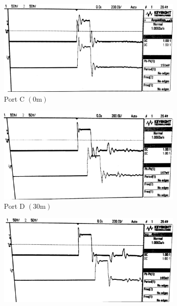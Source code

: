 \documentclass[10pt]{article}
\begin{document}
\begin{figure}[ht]
    \centering
    \begin{subfigure}[b]{0.45\textwidth}
        \includegraphics[width=\textwidth]{../photos/lab1/v_t_pt_c.jpg}
        \caption{Port C $(0\text{m})$}
    \end{subfigure}
    \quad
    \begin{subfigure}[b]{0.45\textwidth}
        \includegraphics[width=\textwidth]{../photos/lab1/v_t_pt_d.jpg}
        \caption{Port D $(30\text{m})$}
    \end{subfigure}
    \begin{subfigure}[b]{0.45\textwidth}
        \includegraphics[width=\textwidth]{../photos/lab1/v_t_pt_e.jpg}

\end{subfigure}
\end{figure}
\end{document}
